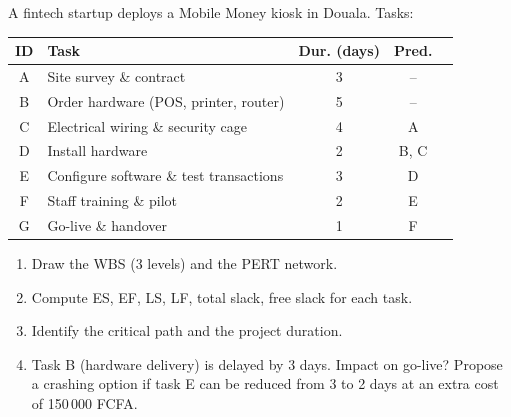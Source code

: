 \documentclass[11pt]{article}
\begin{document}
\begin{exercice}
A fintech startup deploys a Mobile Money kiosk in Douala. Tasks:
\begin{center}
\begin{tabular}{|c|l|c|cc|}\hline
\rowcolor{popblueL} \textbf{ID} & \textbf{Task} & \textbf{Dur. (days)} & \textbf{Pred.} \\ \hline
A & Site survey \& contract & 3 & -- \\ \hline
B & Order hardware (POS, printer, router) & 5 & -- \\ \hline
C & Electrical wiring \& security cage & 4 & A \\ \hline
D & Install hardware & 2 & B, C \\ \hline
E & Configure software \& test transactions & 3 & D \\ \hline
F & Staff training \& pilot & 2 & E \\ \hline
G & Go-live \& handover & 1 & F \\ \hline
\end{tabular}
\end{center}
\begin{enumerate}
\item Draw the WBS (3 levels) and the PERT network.
\item Compute ES, EF, LS, LF, total slack, free slack for each task.
\item Identify the critical path and the project duration.
\item Task B (hardware delivery) is delayed by 3 days. Impact on go-live? Propose a crashing option if task E can be reduced from 3 to 2 days at an extra cost of 150\,000 FCFA.
\end{enumerate}
\end{exercice}
\end{document}
